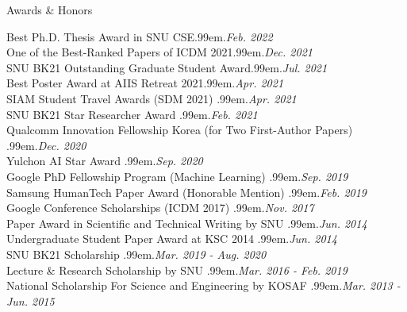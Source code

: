 \documentclass{resume} %
\makeatletter
\newcommand \Dotfill {\leavevmode \cleaders \hb@xt@ .99em{\hss .\hss }\hfill \kern \z@}
\makeatother
\begin{document}
\begin{rSection}{Awards \& Honors}

Best Ph.D. Thesis Award in SNU CSE\smallskip \Dotfill \emph{Feb. 2022} \\ 
One of the Best-Ranked Papers of ICDM 2021\smallskip \Dotfill \emph{Dec. 2021} \\ 
SNU BK21 Outstanding Graduate Student Award\smallskip \Dotfill \emph{Jul. 2021} \\ 
Best Poster Award at AIIS Retreat 2021\smallskip \Dotfill \emph{Apr. 2021} \\ 
SIAM Student Travel Awards (SDM 2021) \smallskip \Dotfill \emph{Apr. 2021} \\ 
SNU BK21 Star Researcher Award \smallskip \Dotfill \emph{Feb. 2021} \\ 
Qualcomm Innovation Fellowship Korea (for Two First-Author Papers) \smallskip \Dotfill \emph{Dec. 2020} \\ 
Yulchon AI Star Award \smallskip \Dotfill \emph{Sep. 2020} \\ 
Google PhD Fellowship Program (Machine Learning) \smallskip \Dotfill \emph{Sep. 2019} \\ 
Samsung HumanTech Paper Award (Honorable Mention) \smallskip \Dotfill \emph{Feb. 2019} \\ 
Google Conference Scholarships (ICDM 2017) \smallskip \Dotfill \emph{Nov. 2017} \\ 
Paper Award in Scientific and Technical Writing by SNU \smallskip \Dotfill \emph{Jun. 2014} \\ 
Undergraduate Student Paper Award at KSC 2014 \smallskip \Dotfill \emph{Jun. 2014} \\
SNU BK21 Scholarship \smallskip \Dotfill \emph{Mar. 2019 - Aug. 2020} \\ 
Lecture \& Research Scholarship by SNU \smallskip \Dotfill \emph{Mar. 2016 - Feb. 2019} \\
National Scholarship For Science and Engineering by KOSAF \smallskip \Dotfill \emph{Mar. 2013 - Jun. 2015}

\end{rSection}

\end{document}
